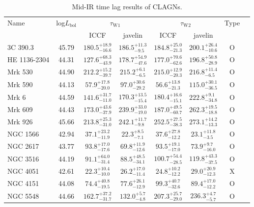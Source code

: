 \documentclass[linenumbers]{aastex631}
\begin{document}
\begin{table}
\renewcommand{\arraystretch}{1.5}
 \caption{Mid-IR time lag results of CLAGNs.
}
 \label{table_lag}
 \begin{center}
 \begin{tabular}{lccccccc}
 \hline\hline
Name & log$L_\mathrm{bol}$ & \multicolumn{2}{c}{$\tau_\mathrm{W1}$} & \multicolumn{2}{c}{$\tau_\mathrm{W2}$} &Type \\ 
      &                      &   ICCF     &  {\sc javelin}   &    ICCF & {\sc javelin} &   \\ \hline 
3C 390.3 & 45.79 & $180.5_{-16.6}^{+18.9}$ & $186.5_{-9.5}^{+11.3}$ & $184.8_{-21.3}^{+25.0}$ & $200.1_{-10.6}^{+26.4}$ & O \\
HE 1136-2304 & 44.31 & $127.6_{-43.9}^{+68.3}$ & $178.7_{-47.6}^{+54.9}$ & $177.0_{-62.6}^{+70.6}$ & $196.8_{-28.9}^{+50.8}$ & O \\
Mrk 530 & 44.90 & $212.2_{-39.7}^{+15.2}$ & $215.2_{-6.5}^{+6.1}$ & $215.0_{-20.3}^{+12.9}$ & $216.8_{-6.5}^{+11.4}$ & O \\
Mrk 590 & 44.13 & $57.9_{-20.0}^{+17.8}$ & $97.0_{-29.2}^{+30.6}$ & $56.6_{-21.3}^{+13.8}$ & $115.0_{-36.5}^{+30.1}$ & O \\
Mrk 6 & 44.59 & $141.6_{-11.0}^{+31.7}$ & $170.3_{-15.4}^{+13.5}$ & $180.4_{-15.1}^{+16.6}$ & $222.8_{-34.8}^{+9.1}$ & O \\
Mrk 609 & 44.43 & $173.0_{-37.9}^{+43.6}$ & $239.9_{-19.0}^{+33.0}$ & $187.0_{-60.7}^{+49.5}$ & $262.3_{-18.8}^{+19.5}$ & O \\
Mrk 926 & 45.66 & $213.8_{-31.0}^{+25.3}$ & $242.1_{-9.8}^{+11.7}$ & $252.5_{-38.3}^{+27.5}$ & $273.1_{-13.3}^{+14.2}$ & O \\
NGC 1566 & 42.94 & $37.1_{-11.9}^{+23.2}$ & $22.3_{-7.1}^{+8.5}$ & $37.6_{-12.2}^{+27.8}$ & $23.1_{-3.5}^{+11.8}$ & O \\
NGC 2617 & 43.77 & $93.8_{-17.6}^{+17.0}$ & $69.8_{-12.6}^{+11.9}$ & $93.5_{-17.0}^{+19.1}$ & $73.9_{-16.0}^{+9.7}$ & O \\
NGC 3516 & 44.19 & $91.1_{-31.4}^{+64.0}$ & $88.5_{-34.1}^{+48.5}$ & $100.7_{-28.5}^{+54.4}$ & $119.8_{-37.5}^{+43.3}$ & O \\
NGC 4051 & 42.61 & $22.3_{-10.0}^{+10.4}$ & $26.2_{-11.4}^{+17.0}$ & $24.8_{-12.2}^{+10.2}$ & $29.0_{-12.3}^{+20.9}$ & X \\
NGC 4151 & 44.08 & $74.4_{-19.5}^{+40.8}$ & $77.6_{-12.9}^{+26.1}$ & $99.3_{-32.6}^{+40.7}$ & $89.4_{-12.2}^{+17.0}$ & O \\
NGC 5548 & 44.66 & $162.7_{-31.7}^{+37.2}$ & $132.0_{-4.8}^{+5.7}$ & $207.3_{-29.0}^{+25.7}$ & $236.3_{-5.7}^{+4.7}$ & O \\

\end{tabular}
\end{center}
\end{table}
\end{document}
